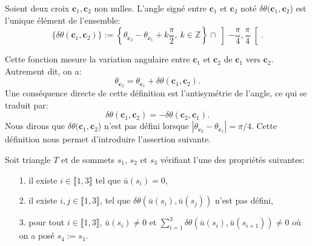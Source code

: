 \begin{definition}
Soient deux croix $\mathbf{c}_1,\mathbf{c}_2$ non nulles. L'angle signé entre $\mathbf{c}_1$ et $\mathbf{c}_2$ noté $\delta\theta(\mathbf{c}_1,\mathbf{c}_2$) est l'unique élément de l'ensemble:
$$
\{\delta\theta(\mathbf{c}_1,\mathbf{c}_2)\}:=\left\{\theta_{\mathbf{c}_2}-\theta_{\mathbf{c}_1}+k\frac{\pi}{2},~k\in\mathbb{Z}\right\}\cap\left]-\frac{\pi}{4}, \frac{\pi}{4}\right[.
$$
\end{definition}
Cette fonction mesure la variation angulaire entre $\mathbf{c}_1$ et $\mathbf{c}_2$ de $\mathbf{c}_1$ vers $\mathbf{c}_2$. Autrement dit, on a:
$$
\theta_{\mathbf{c}_2}=\theta_{\mathbf{c}_1}+\delta\theta(\mathbf{c}_1,\mathbf{c}_2).
$$
Une conséquence directe de cette définition est l'antisymétrie de l'angle, ce qui se traduit par:
$$
\delta\theta(\mathbf{c}_1, \mathbf{c}_2)=-\delta\theta(\mathbf{c}_2,\mathbf{c}_1).
$$
Nous dirons que $\delta\theta(\mathbf{c}_1,\mathbf{c}_2$) n'est pas défini lorsque $|\theta_{\mathbf{c}_2}-\theta_{\mathbf{c}_1}|=\pi/4$.
Cette définition nous permet d'introduire l'assertion suivante.
\begin{assertion}
\label{ass:triangle_singulier}
 Soit triangle $T$ et de sommets $s_1$, $s_2$ et $s_3$ vérifiant l'une des propriétés suivantes:\\
 \begin{itemize}
  \item[1.] il existe $i\in\llbracket 1, 3\rrbracket$ tel que $\bar{u}(s_i)=0$,\\%
  \item[2.] il existe  $i,j\in\llbracket 1, 3\rrbracket$, tel que  $\delta\theta(\bar{u}(s_i),\bar{u}(s_{j}))$ n'est pas défini,\\%
  \item[3.] pour tout $i\in\llbracket 1, 3\rrbracket$, $\bar{u}(s_i)\neq 0$ et $\sum_{i=1}^3\delta\theta(\bar{u}(s_i),\bar{u}(s_{i+1}))\neq 0$ où on a posé $s_4:=s_1$.\\[-0.2cm]
 \end{itemize}
\end{assertion}

